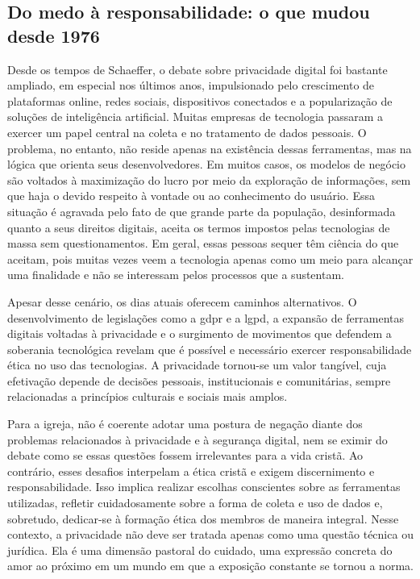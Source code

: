 \subsection{Do medo à responsabilidade: o que mudou desde 1976}

Desde os tempos de Schaeffer, o debate sobre privacidade digital foi bastante ampliado, em especial nos últimos anos, impulsionado pelo crescimento de plataformas online, redes sociais, dispositivos conectados e a popularização de soluções de inteligência artificial. Muitas empresas de tecnologia passaram a exercer um papel central na coleta e no tratamento de dados pessoais. O problema, no entanto, não reside apenas na existência dessas ferramentas, mas na lógica que orienta seus desenvolvedores. Em muitos casos, os modelos de negócio são voltados à maximização do lucro por meio da exploração de informações, sem que haja o devido respeito à vontade ou ao conhecimento do usuário. Essa situação é agravada pelo fato de que grande parte da população, desinformada quanto a seus direitos digitais, aceita os termos impostos pelas tecnologias de massa sem questionamentos. Em geral, essas pessoas sequer têm ciência do que aceitam, pois muitas vezes veem a tecnologia apenas como um meio para alcançar uma finalidade e não se interessam pelos processos que a sustentam.

Apesar desse cenário, os dias atuais oferecem caminhos alternativos. O desenvolvimento de legislações como a \gls{gdpr} e a \gls{lgpd}, a expansão de ferramentas digitais voltadas à privacidade e o surgimento de movimentos que defendem a soberania tecnológica revelam que é possível e necessário exercer responsabilidade ética no uso das tecnologias. A privacidade tornou-se um valor tangível, cuja efetivação depende de decisões pessoais, institucionais e comunitárias, sempre relacionadas a princípios culturais e sociais mais amplos.

Para a igreja, não é coerente adotar uma postura de negação diante dos problemas relacionados à privacidade e à segurança digital, nem se eximir do debate como se essas questões fossem irrelevantes para a vida cristã. Ao contrário, esses desafios interpelam a ética cristã e exigem discernimento e responsabilidade. Isso implica realizar escolhas conscientes sobre as ferramentas utilizadas, refletir cuidadosamente sobre a forma de coleta e uso de dados e, sobretudo, dedicar-se à formação ética dos membros de maneira integral. Nesse contexto, a privacidade não deve ser tratada apenas como uma questão técnica ou jurídica. Ela é uma dimensão pastoral do cuidado, uma expressão concreta do amor ao próximo em um mundo em que a exposição constante se tornou a norma.

